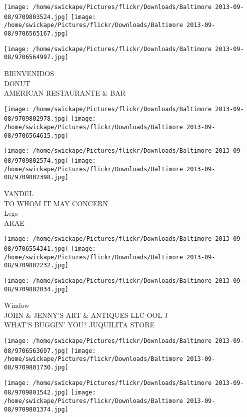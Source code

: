 \documentclass[10pt,letterpaper]{article}
\begin{document}
\texttt{[image: /home/swickape/Pictures/flickr/Downloads/Baltimore 2013-09-08/9709803524.jpg]}
\texttt{[image: /home/swickape/Pictures/flickr/Downloads/Baltimore 2013-09-08/9706565167.jpg]}

\vspace{0.25in}
\texttt{[image: /home/swickape/Pictures/flickr/Downloads/Baltimore 2013-09-08/9706564997.jpg]}

BIENVENIDOS\\
DONUT\\
AMERICAN RESTAURANTE \& BAR
\pagebreak

\texttt{[image: /home/swickape/Pictures/flickr/Downloads/Baltimore 2013-09-08/9709802978.jpg]}
\texttt{[image: /home/swickape/Pictures/flickr/Downloads/Baltimore 2013-09-08/9706564615.jpg]}

\texttt{[image: /home/swickape/Pictures/flickr/Downloads/Baltimore 2013-09-08/9709802574.jpg]}
\texttt{[image: /home/swickape/Pictures/flickr/Downloads/Baltimore 2013-09-08/9709802398.jpg]}

VANDEL\\
TO WHOM IT MAY CONCERN\\
Legs\\
ARAE
\pagebreak

\texttt{[image: /home/swickape/Pictures/flickr/Downloads/Baltimore 2013-09-08/9706554341.jpg]}
\texttt{[image: /home/swickape/Pictures/flickr/Downloads/Baltimore 2013-09-08/9709802232.jpg]}

\vspace{0.25in}
\texttt{[image: /home/swickape/Pictures/flickr/Downloads/Baltimore 2013-09-08/9709802034.jpg]}

Window\\
JOHN \& JENNY'S ART \& ANTIQUES LLC OOL J\\
WHAT'S BUGGIN' YOU? JUQUILITA STORE
\pagebreak

\texttt{[image: /home/swickape/Pictures/flickr/Downloads/Baltimore 2013-09-08/9706563697.jpg]}
\texttt{[image: /home/swickape/Pictures/flickr/Downloads/Baltimore 2013-09-08/9709801730.jpg]}

\texttt{[image: /home/swickape/Pictures/flickr/Downloads/Baltimore 2013-09-08/9709801542.jpg]}
\texttt{[image: /home/swickape/Pictures/flickr/Downloads/Baltimore 2013-09-08/9709801374.jpg]}
\end{document}
